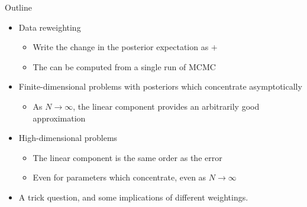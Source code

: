 \begin{frame}{Outline}
%
\begin{itemize}
%
\item Data reweighting
%
\begin{itemize}
%
\item Write the change in the posterior expectation
    as  $+$ 
\item The  can be computed from a
single run of MCMC
%
\end{itemize}

\pause
%
\item Finite-dimensional problems with posteriors which concentrate
asymptotically
%
\begin{itemize}
%
\item As $N \rightarrow \infty$, the linear component provides
an arbitrarily good approximation
%
\end{itemize}
%
\pause
\item High-dimensional problems
\begin{itemize}
%
\item The linear component is the same order as the error
\item Even for parameters which concentrate, even as
$N \rightarrow \infty$

\pause
\end{itemize}
\item A trick question, and some implications of
different weightings.
%
\end{itemize}
%
\end{frame}

